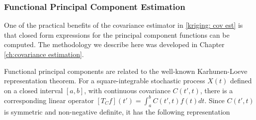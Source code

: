 


\subsubsection{Functional Principal Component Estimation} %
\label{sub:FPC estimation}

One of the practical benefits of the covariance estimator in \eqref{kriging: cov est} is that closed form expressions for the principal component functions can be computed. The methodology we describe here was developed in Chapter \ref{ch:covariance estimation}.

Functional principal components are related to the well-known Karhunen-Loeve representation theorem. For a square-integrable stochastic process $X(t)$ defined on a closed interval $[a,b]$, with continuous covariance $C(t',t)$, there is a corresponding linear operator $[T_Cf](t') = \int_a^bC(t',t)f(t)dt$. Since $C(t',t)$ is symmetric and non-negative definite, it has the following representation 

